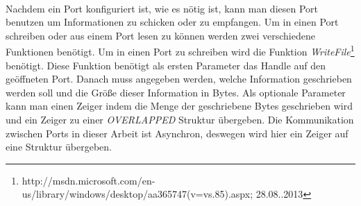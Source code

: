 \paragraph{}
Nachdem ein Port konfiguriert ist, wie es nötig ist, kann man diesen Port benutzen um Informationen zu schicken oder zu empfangen. Um in einen Port schreiben oder aus einem Port lesen zu können  werden zwei verschiedene Funktionen benötigt. Um in einen Port zu schreiben wird die Funktion \textit{WriteFile}\footnote{http://msdn.microsoft.com/en-us/library/windows/desktop/aa365747(v=vs.85).aspx; 28.08..2013} benötigt. Diese Funktion benötigt als ersten Parameter das Handle auf den geöffneten Port. Danach muss angegeben werden, welche Information geschrieben werden soll und die Größe dieser Information in Bytes. Als optionale Parameter kann man einen Zeiger indem die Menge der geschriebene Bytes geschrieben wird und ein Zeiger zu einer \textit{OVERLAPPED} Struktur übergeben. Die Kommunikation zwischen Ports in dieser Arbeit ist Asynchron, deswegen wird hier ein Zeiger auf eine Struktur übergeben.
\\

